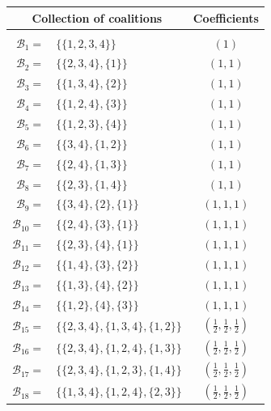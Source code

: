 \documentclass[10pt,a4paper,titlepage]{article}
\theoremstyle{plain}
\theoremstyle{definition}
\begin{document}
\begin{center}
\begin{tabular}{ | r l | c | }
    \multicolumn{2}{c}{Collection of coalitions} & \multicolumn{1}{c}{Coefficients}\\
    \hline & & \\[-10pt]
    $\mathcal{B}_{1} =$ & $\{\{1,2,3,4\}\}$ & $\left(1\right)$\\[2pt]
    $\mathcal{B}_{2} =$ & $\{\{2,3,4\}, \{1\}\}$ & $\left(1, 1\right)$\\[2pt]
    $\mathcal{B}_{3} =$ & $\{\{1,3,4\}, \{2\}\}$ & $\left(1, 1\right)$\\[2pt]
    $\mathcal{B}_{4} =$ & $\{\{1,2,4\}, \{3\}\}$ & $\left(1, 1\right)$\\[2pt]
    $\mathcal{B}_{5} =$ & $\{\{1,2,3\}, \{4\}\}$ & $\left(1, 1\right)$\\[2pt]
    $\mathcal{B}_{6} =$ & $\{\{3,4\}, \{1,2\}\}$ & $\left(1, 1\right)$\\[2pt]
    $\mathcal{B}_{7} =$ & $\{\{2,4\}, \{1,3\}\}$ & $\left(1, 1\right)$\\[2pt]
    $\mathcal{B}_{8} =$ & $\{\{2,3\}, \{1,4\}\}$ & $\left(1, 1\right)$\\[2pt]
    $\mathcal{B}_{9} =$ & $\{\{3,4\}, \{2\}, \{1\}\}$ & $\left(1, 1, 1\right)$\\[2pt]
    $\mathcal{B}_{10} =$ & $\{\{2,4\}, \{3\}, \{1\}\}$ & $\left(1, 1, 1\right)$\\[2pt]
    $\mathcal{B}_{11} =$ & $\{\{2,3\}, \{4\}, \{1\}\}$ & $\left(1, 1, 1\right)$\\[2pt]
    $\mathcal{B}_{12} =$ & $\{\{1,4\}, \{3\}, \{2\}\}$ & $\left(1, 1, 1\right)$\\[2pt]
    $\mathcal{B}_{13} =$ & $\{\{1,3\}, \{4\}, \{2\}\}$ & $\left(1, 1, 1\right)$\\[2pt]
    $\mathcal{B}_{14} =$ & $\{\{1,2\}, \{4\}, \{3\}\}$ & $\left(1, 1, 1\right)$\\[2pt]
    $\mathcal{B}_{15} =$ & $\{\{2,3,4\}, \{1,3,4\}, \{1,2\}\}$ & $\left(\frac{1}{2}, \frac{1}{2}, \frac{1}{2}\right)$\\[2pt]
    $\mathcal{B}_{16} =$ & $\{\{2,3,4\}, \{1,2,4\}, \{1,3\}\}$ & $\left(\frac{1}{2}, \frac{1}{2}, \frac{1}{2}\right)$\\[2pt]
    $\mathcal{B}_{17} =$ & $\{\{2,3,4\}, \{1,2,3\}, \{1,4\}\}$ & $\left(\frac{1}{2}, \frac{1}{2}, \frac{1}{2}\right)$\\[2pt]
    $\mathcal{B}_{18} =$ & $\{\{1,3,4\}, \{1,2,4\}, \{2,3\}\}$ & $\left(\frac{1}{2}, \frac{1}{2}, \frac{1}{2}\right)$\\[2pt]

\end{tabular}
\end{center}
\end{document}
